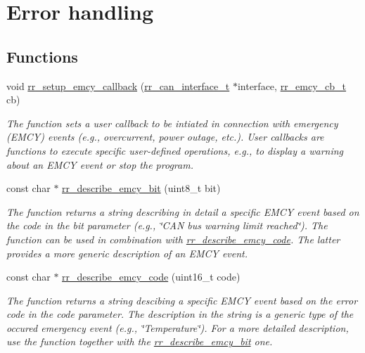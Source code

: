 \hypertarget{group___err}{}\section{Error handling}
\label{group___err}
\subsection*{Functions}
\begin{DoxyCompactItemize}
\item 
void \hyperlink{group___err_ga40acd9287486a662f2b17b89c4f08aed}{rr\+\_\+setup\+\_\+emcy\+\_\+callback} (\hyperlink{structrr__can__interface__t}{rr\+\_\+can\+\_\+interface\+\_\+t} $\ast$interface, \hyperlink{api_8h_a3850d8aa5bc177cb66b7638cafd30204}{rr\+\_\+emcy\+\_\+cb\+\_\+t} cb)
\begin{DoxyCompactList}\small\item\em The function sets a user callback to be intiated in connection with emergency (E\+M\+CY) events (e.\+g., overcurrent, power outage, etc.). User callbacks are functions to execute specific user-\/defined operations, e.\+g., to display a warning about an E\+M\+CY event or stop the program. \end{DoxyCompactList}\item 
const char $\ast$ \hyperlink{group___err_gaa949cec80a64afa06ed9816fe1132888}{rr\+\_\+describe\+\_\+emcy\+\_\+bit} (uint8\+\_\+t bit)
\begin{DoxyCompactList}\small\item\em The function returns a string describing in detail a specific E\+M\+CY event based on the code in the \textquotesingle{}bit\textquotesingle{} parameter (e.\+g., \char`\"{}\+C\+A\+N bus warning limit reached\char`\"{}). The function can be used in combination with \hyperlink{group___err_ga2a5b7ff5f0e37ae3a856757cff7ced4f}{rr\+\_\+describe\+\_\+emcy\+\_\+code}. The latter provides a more generic description of an E\+M\+CY event. \end{DoxyCompactList}\item 
const char $\ast$ \hyperlink{group___err_ga2a5b7ff5f0e37ae3a856757cff7ced4f}{rr\+\_\+describe\+\_\+emcy\+\_\+code} (uint16\+\_\+t code)
\begin{DoxyCompactList}\small\item\em The function returns a string descibing a specific E\+M\+CY event based on the error code in the \textquotesingle{}code\textquotesingle{} parameter. The description in the string is a generic type of the occured emergency event (e.\+g., \char`\"{}\+Temperature\char`\"{}). For a more detailed description, use the function together with the \hyperlink{group___err_gaa949cec80a64afa06ed9816fe1132888}{rr\+\_\+describe\+\_\+emcy\+\_\+bit} one. \end{DoxyCompactList}\item 

\end{DoxyCompactItemize}
